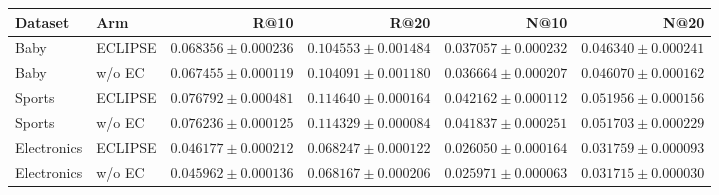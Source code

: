 \begin{tabular}{llrrrr}
\toprule
Dataset & Arm & R@10 & R@20 & N@10 & N@20 \\
\midrule
Baby & ECLIPSE & $0.068356 \pm 0.000236$ & $0.104553 \pm 0.001484$ & $0.037057 \pm 0.000232$ & $0.046340 \pm 0.000241$ \\
Baby & w/o EC & $0.067455 \pm 0.000119$ & $0.104091 \pm 0.001180$ & $0.036664 \pm 0.000207$ & $0.046070 \pm 0.000162$ \\
Sports & ECLIPSE & $0.076792 \pm 0.000481$ & $0.114640 \pm 0.000164$ & $0.042162 \pm 0.000112$ & $0.051956 \pm 0.000156$ \\
Sports & w/o EC & $0.076236 \pm 0.000125$ & $0.114329 \pm 0.000084$ & $0.041837 \pm 0.000251$ & $0.051703 \pm 0.000229$ \\
Electronics & ECLIPSE & $0.046177 \pm 0.000212$ & $0.068247 \pm 0.000122$ & $0.026050 \pm 0.000164$ & $0.031759 \pm 0.000093$ \\
Electronics & w/o EC & $0.045962 \pm 0.000136$ & $0.068167 \pm 0.000206$ & $0.025971 \pm 0.000063$ & $0.031715 \pm 0.000030$ \\
\bottomrule
\end{tabular}
